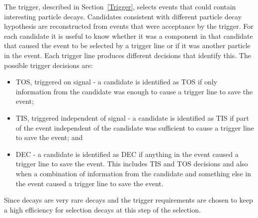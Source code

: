 The trigger, described in Section~\ref{Trigger}, selects events that could contain interesting particle decays. Candidates consistent with different particle decay hypothesis are reconstructed from events that were acceptance by the trigger.
For each candidate it is useful to know whether it was a component in that candidate that caused the event to be selected by a trigger line or if it was another particle in the event. 
Each trigger line produces different decisions that identify this. 
The possible trigger decisions are: %
\begin{itemize}
\item TOS, triggered on signal - a candidate is identified as TOS if only information from the candidate was enough to cause a trigger line to save the event;
\item TIS, triggered independent of signal - a candidate is identified as TIS if part of the event independent of the candidate was sufficient to cause a trigger line to save the event; and
\item DEC - a candidate is identified as DEC if anything in the event caused a trigger line to save the event. This includes TIS and TOS decisions and also when a combination of information from the candidate and something else in the event caused a trigger line to save the event.
\end{itemize}
Since \bmumu decays are very rare decays and the trigger requirements are chosen to keep a high efficiency for selection \bmumu decays at this step of the selection. 
